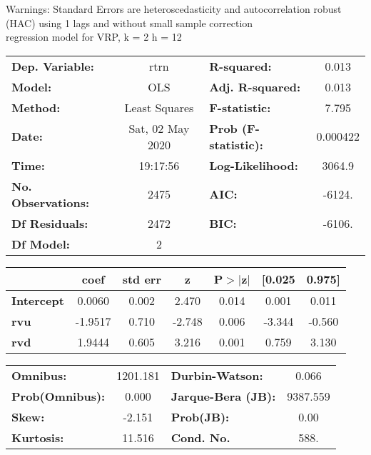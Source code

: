Warnings: \newline
 [1] Standard Errors are heteroscedasticity and autocorrelation robust (HAC) using 1 lags and without small sample correction\\ 

regression model for VRP, k = 2 h = 12\begin{center}
\begin{tabular}{lclc}
\toprule
\textbf{Dep. Variable:}    &       rtrn       & \textbf{  R-squared:         } &     0.013   \\
\textbf{Model:}            &       OLS        & \textbf{  Adj. R-squared:    } &     0.013   \\
\textbf{Method:}           &  Least Squares   & \textbf{  F-statistic:       } &     7.795   \\
\textbf{Date:}             & Sat, 02 May 2020 & \textbf{  Prob (F-statistic):} &  0.000422   \\
\textbf{Time:}             &     19:17:56     & \textbf{  Log-Likelihood:    } &    3064.9   \\
\textbf{No. Observations:} &        2475      & \textbf{  AIC:               } &    -6124.   \\
\textbf{Df Residuals:}     &        2472      & \textbf{  BIC:               } &    -6106.   \\
\textbf{Df Model:}         &           2      & \textbf{                     } &             \\
\bottomrule
\end{tabular}
\begin{tabular}{lcccccc}
                   & \textbf{coef} & \textbf{std err} & \textbf{z} & \textbf{P$> |$z$|$} & \textbf{[0.025} & \textbf{0.975]}  \\
\midrule
\textbf{Intercept} &       0.0060  &        0.002     &     2.470  &         0.014        &        0.001    &        0.011     \\
\textbf{rvu}       &      -1.9517  &        0.710     &    -2.748  &         0.006        &       -3.344    &       -0.560     \\
\textbf{rvd}       &       1.9444  &        0.605     &     3.216  &         0.001        &        0.759    &        3.130     \\
\bottomrule
\end{tabular}
\begin{tabular}{lclc}
\textbf{Omnibus:}       & 1201.181 & \textbf{  Durbin-Watson:     } &    0.066  \\
\textbf{Prob(Omnibus):} &   0.000  & \textbf{  Jarque-Bera (JB):  } & 9387.559  \\
\textbf{Skew:}          &  -2.151  & \textbf{  Prob(JB):          } &     0.00  \\
\textbf{Kurtosis:}      &  11.516  & \textbf{  Cond. No.          } &     588.  \\
\bottomrule
\end{tabular}
\end{center}

